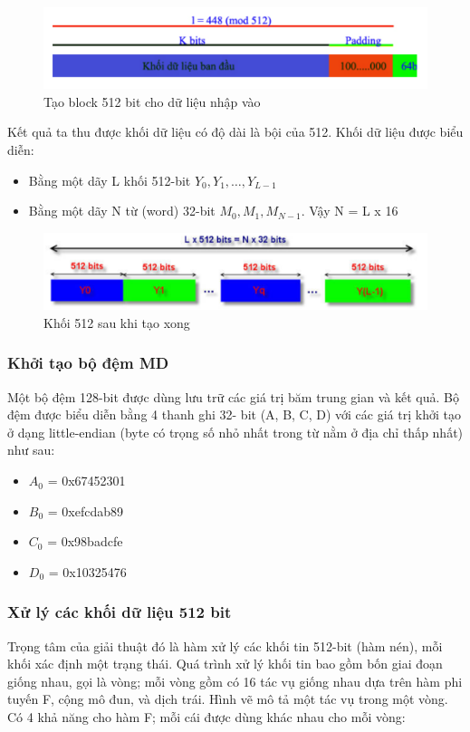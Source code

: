 \documentclass[../report.tex]{subfiles}
\begin{document}
\begin{figure}[H]
    \centering
    \includegraphics[width=\textwidth]{figures/block.png}
    \caption{Tạo block 512 bit cho dữ liệu nhập vào}
\end{figure}
Kết quả ta thu được khối dữ liệu có độ dài là bội của 512. Khối dữ liệu được biểu diễn:
\begin{itemize}
    \item Bằng một dãy L khối 512-bit $Y_0, Y_1,…, Y_{L-1}$
    \item Bằng một dãy N từ (word) 32-bit $M_0, M_1, M_{N-1}$. Vậy N = L x 16
\end{itemize}
\begin{figure}[H]
    \centering
    \includegraphics[width=\textwidth]{figures/blockCom.png}
    \caption{Khối 512 sau khi tạo xong}
\end{figure}
\subsubsection{Khởi tạo bộ đệm MD}
Một bộ đệm 128-bit được dùng lưu trữ các giá trị băm trung
gian và kết quả. Bộ đệm được biểu diễn bằng 4 thanh ghi 32-
bit (A, B, C, D) với các giá trị khởi tạo ở dạng little-endian (byte có trọng
số nhỏ nhất trong từ nằm ở địa chỉ thấp nhất) như sau:
    \begin{itemize}
        \item $A_0$ = 0x67452301 
        \item $B_0$ = 0xefcdab89 
        \item $C_0$ = 0x98badcfe   
        \item $D_0$ = 0x10325476   
    \end{itemize}

\subsubsection{Xử lý các khối dữ liệu 512 bit}
Trọng tâm của giải thuật đó là hàm xử lý các khối tin 512-bit (hàm nén), mỗi khối xác định một trạng thái. Quá trình xử lý khối tin 
bao gồm bốn giai đoạn giống nhau, gọi là vòng; mỗi vòng gồm có 16 tác vụ giống nhau dựa trên hàm phi tuyến F, cộng mô đun, và dịch trái. 
Hình vẽ mô tả một tác vụ trong một vòng. Có 4 khả năng cho hàm F; mỗi cái được dùng khác nhau cho mỗi vòng:
\end{document}
